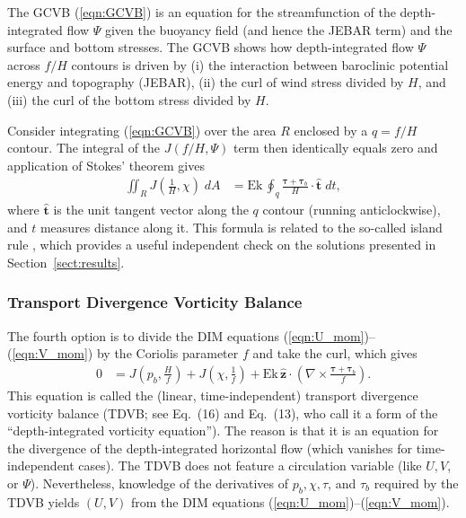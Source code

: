 \documentclass{ametsocV6.2}
\begin{document}
The GCVB (\ref{eqn:GCVB}) is an equation for the streamfunction of the depth-integrated flow $\Psi$ given the buoyancy field (and hence the JEBAR term) and the surface and bottom stresses.
The GCVB shows how depth-integrated flow $\Psi$ across $f/H$ contours is driven by (i) the interaction between baroclinic potential energy and topography (JEBAR), (ii) the curl of wind stress divided by $H$, and (iii) the curl of the bottom stress divided by $H$.

Consider integrating (\ref{eqn:GCVB}) over the area $R$ enclosed by a $q = f/H$ contour. 
The integral of the $J(f/H, \Psi)$ term then identically equals zero and application of Stokes' theorem gives
\begin{align}
\iint_{R} J \left( \frac{1}{H}, \chi \right) \; dA & =
\mathrm{Ek} \, \oint_{q} \frac{\boldsymbol{\tau} + \boldsymbol{\tau}_b}{H} \cdot  \hat{\mathbf{t}} \; dt,
\label{eqn:integrated_GCVB}
\end{align}
where $\hat{\mathbf{t}}$ is the unit tangent vector along the $q$ contour (running anticlockwise), and $t$ measures distance along it.
This formula is related to the so-called island rule \citep{godfrey89,krupitsky&cane97,cane_etal98}, which provides a useful independent check on the solutions presented in Section~\ref{sect:results}.

\subsubsection{Transport Divergence Vorticity Balance}
The fourth option is to divide the DIM equations (\ref{eqn:U_mom})--(\ref{eqn:V_mom}) by the Coriolis parameter $f$ and take the curl, which gives
\begin{align}
0 & = J \left( p_b, \frac{H}{f} \right) +  J \left( \chi, \frac{1}{f} \right) + \mathrm{Ek} \, {\hat{\mathbf z}} \cdot \left( \nabla \times \frac{\boldsymbol{\tau} + \boldsymbol{\tau}_b}{f} \right) .
\label{eqn:TDVB}
\end{align}
This equation is called the (linear, time-independent) transport divergence vorticity balance (TDVB; see \citealt{waldman&giordani23} Eq.~(16) and \citealt{nost&isachsen03} Eq.~(13), who call it a form of the ``depth-integrated vorticity equation'').
The reason is that it is an equation for the divergence of the depth-integrated horizontal flow (which vanishes for time-independent cases).
The TDVB does not feature a circulation variable (like $U, V$, or $\Psi$).
Nevertheless, knowledge of the derivatives of $p_b, \chi, \tau$, and $\tau_b$ required by the TDVB yields $(U, V)$ from the DIM equations (\ref{eqn:U_mom})--(\ref{eqn:V_mom}).
\end{document}
